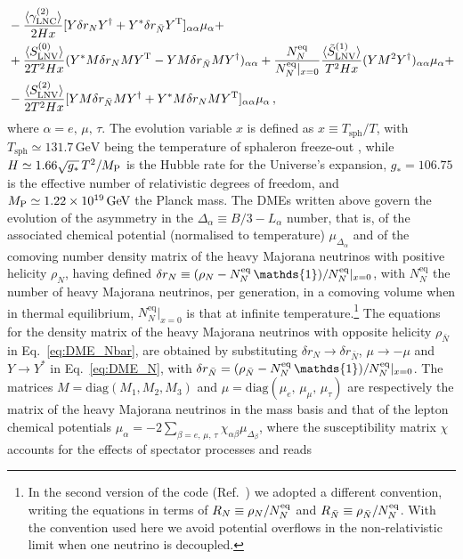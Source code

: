 \documentclass[12pt, a4paper]{article}
\def\sph{\text{sph}}
\def\LNC{\text{LNC}}
\def\LNV{\text{LNV}}
\begin{document}
\begin{subequations}
\begin{align}
&-\frac{\langle\gamma_{\LNC}^{(2)}\rangle}{2Hx}[Y\delta r_NY^\dagger+Y^*\delta r_{\bar{N}}Y^{\rm T}]_{\alpha\alpha}\mu_\alpha+\nonumber\\
&{}+ \frac{\langle S_{\LNV}^{(0)}\rangle}{2T^2Hx}(Y^*M\delta r_NMY^{\rm T}-YM\delta r_{\bar{N}}MY^\dagger)_{\alpha\alpha}+ \frac{N_N^{\rm eq}}{N_N^{\rm eq}|_{x=0}}\frac{\langle \tilde{S}_{\LNV}^{(1)}\rangle}{T^2Hx}(YM^2Y^\dagger)_{\alpha\alpha}\mu_\alpha+ \nonumber\\
&{}-\frac{\langle S_{\LNV}^{(2)}\rangle}{2T^2Hx}[YM\delta r_{\bar{N}}MY^\dagger+Y^*M\delta r_NMY^{\rm T}]_{\alpha\alpha}\mu_\alpha\,,
\label{eq:DME_mu}
 \end{align}
 \end{subequations}
 where $\alpha = e,\,\mu,\,\tau$. The evolution variable $x$ is defined as $x\equiv T_{\sph}/T$, with $T_{\sph}\simeq 131.7\,\text{GeV}$ being the temperature of sphaleron freeze-out \cite{DOnofrio:2014rug}, while $H \simeq 1.66 \sqrt{g_{*}}\,T^2/M_{\rm P}$ is the Hubble rate for the Universe's expansion, $g_* = 106.75$ is the effective number of relativistic degrees of freedom, and $M_{\rm P}\simeq 1.22 \times 10^{19}\,\text{GeV}$ the Planck mass. The DMEs written above govern the evolution of the asymmetry in the $\Delta_\alpha \equiv B/3-L_\alpha$ number, that is, of the associated chemical potential (normalised to temperature) $\mu_{\Delta_\alpha}$ and of the comoving number density matrix of the heavy Majorana neutrinos with positive helicity $\rho_N$, having defined  $\delta r_N\equiv (\rho_N-N_N^{\rm eq}\, \mathds{1})/N_{N}^\text{eq}|_{x=0}$, with $N_{N}^\text{eq}$ the number of heavy Majorana neutrinos, per generation, in a comoving volume when in thermal equilibrium, $N_{N}^\text{eq}|_{x=0}$ is that at infinite temperature.\footnote{In the second version of the code (Ref.~\cite{Granelli:2023vcm}) we adopted a different convention, writing the equations in terms of $R_N\equiv \rho_N/N_N^{\rm eq}$ and $R_{\bar N}\equiv \rho_{\bar N}/N_N^{\rm eq}$. With the convention used here we avoid potential overflows in the non-relativistic limit when one neutrino is decoupled.} The equations for the density matrix of the heavy Majorana neutrinos with opposite helicity $\rho_{\bar{N}}$ in Eq.~\eqref{eq:DME_Nbar}, are obtained by substituting $\delta r_N\to \delta r_{\bar{N}}$, $\mu \to-\mu$ and $Y\to Y^*$ in Eq.~\eqref{eq:DME_N}, with $\delta r_{\bar{N}}=(\rho_{\bar{N}}-N_N^{\rm eq}\,\mathds{1})/N_{N}^\text{eq}|_{x=0}$.  The matrices $M=\text{diag}(M_1,M_2, M_3)$ and $\mu=\text{diag}(\mu_e,\, \mu_\mu,\,\mu_\tau)$ are respectively the matrix of the heavy Majorana neutrinos in the mass basis and that of the lepton chemical potentials $\mu_\alpha = -2\sum_{\beta =e,\,\mu,\,\tau}\chi_{\alpha\beta}\mu_{\Delta_\beta}$, where the susceptibility matrix $\chi$ accounts for the effects of spectator processes and reads \cite{Eijima:2017anv, Ghiglieri:2017gjz}
\end{document}
